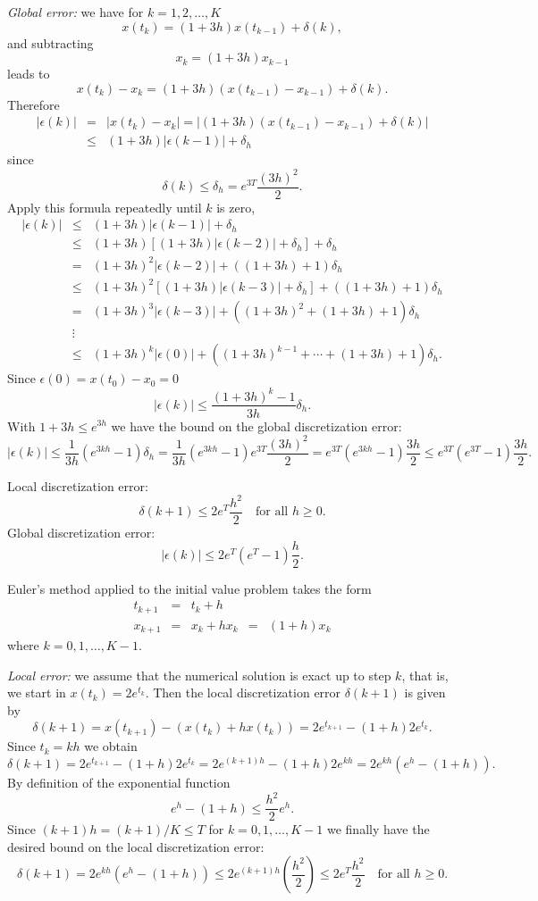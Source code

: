 {\em Global error:} we have for $k=1,2,\ldots,K$
\[
x(t_k)=(1+3h)x(t_{k-1})+\delta(k),
\]
and subtracting
\[
x_k = (1+3h)x_{k-1}
\]
leads to
\[
x(t_k) - x_k = (1+3h)(x(t_{k-1})-x_{k-1})+\delta(k).
\]
Therefore
\begin{eqnarray*}
|\epsilon(k)| & = & |x(t_k) - x_k| =
|(1+3h)(x(t_{k-1})-x_{k-1})+\delta(k)|\\
& \le & (1+3h)|\epsilon(k-1)|+\delta_h
\end{eqnarray*}
since
\[
\delta(k)\le \delta_h = e^{3T}\frac{(3h)^2}{2}.
\]
Apply this formula repeatedly until $k$ is zero,
\[
\begin{array}{rcl}
|\epsilon(k)|&\le&(1+3h)|\epsilon(k-1)|+\delta_h\\
&\le& (1+3h)[(1+3h)|\epsilon(k-2)|+\delta_h]+\delta_h\\
&=& (1+3h)^2|\epsilon(k-2)| + ((1+3h) + 1)\delta_h\\
&\le& (1+3h)^2[(1+3h)|\epsilon(k-3)|+\delta_h] + ((1+3h) + 1)\delta_h\\
&=& (1+3h)^3|\epsilon(k-3)| + ((1+3h)^2 + (1+3h) + 1)\delta_h\\
&\vdots& \\
&\le & (1+3h)^k|\epsilon(0)| + ((1+3h)^{k-1} +\cdots + (1+3h) + 1)\delta_h.
\end{array}
\]
Since $\epsilon(0)=x(t_0) - x_0=0$
\[
|\epsilon(k)| \le \frac{(1+3h)^k -1}{3h}\delta_h.
\]
With $1+3h\le e^{3h}$ we have the bound on the global discretization error:
\[
|\epsilon(k)| \le \frac{1}{3h} (e^{3kh}-1)\delta_h=
\frac{1}{3h}(e^{3kh}-1)e^{3T}\frac{(3h)^2}{2} =
e^{3T}(e^{3kh}-1)\frac{3h}{2}
\le e^{3T}(e^{3T}-1)\frac{3h}{2}.
\]

 \ans Local discretization error:
\[
\delta(k+1) \le
2e^{T}\frac{h^2}{2} \quad \mbox{for all $h\ge 0$.}
\]
Global discretization error:
\[
|\epsilon(k)| \le 2e^{T}(e^{T}-1)\frac{h}{2}.
\]

\soln Euler's method applied to the initial value problem takes the form
\[
\begin{array}{rclcl}
t_{k+1} & = & t_k+h & & \\
x_{k+1} & = & x_k + h x_k & = & (1+h)x_k
\end{array}
\]
where $k=0,1,\ldots,K-1$.

{\em Local error:} we assume that the
numerical solution is exact up to step $k$, that is,
we start in $x(t_k)=2e^{t_k}$.  Then the local discretization error
$\delta(k+1)$ is given by
\[
\delta(k+1) = x(t_{k+1}) - (x(t_k) + h x(t_k))=
2e^{t_{k+1}} - (1+h)2e^{t_k}.
\]
Since $t_k = kh$ we obtain
\[
\delta(k+1) = 2e^{t_{k+1}} - (1+h)2e^{t_k} =
2e^{(k+1)h} - (1+h)2e^{kh} = 2e^{kh}(e^{h}-(1+h)).
\]
By definition of the exponential function
\[
e^{h}-(1+h) \le \frac{h^2}{2}e^{h}.
\]
Since $(k+1)h=(k+1)/K\le T$ for $k=0,1,\ldots,K-1$ we finally have the
desired bound on the local discretization error:
\[
\delta(k+1) = 2e^{kh}(e^{h}-(1+h)) \le
2e^{(k+1)h}\left(\frac{h^2}{2}\right)\le
2e^{T}\frac{h^2}{2} \quad \mbox{for all $h\ge 0$.}
\]


